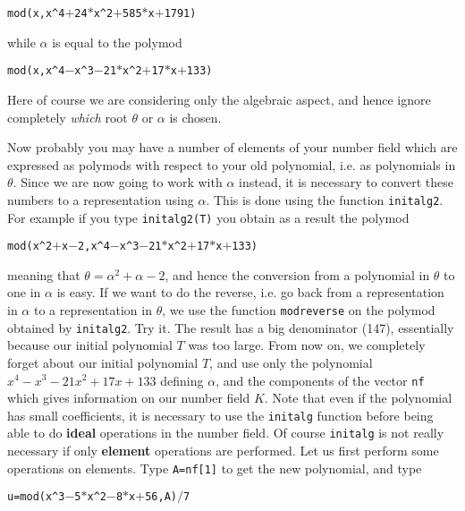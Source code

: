 \centerline{\tt mod(x,x\^{}4$+$24$*$x\^{}2$+$585$*$x$+$1791)}

while $\alpha$ is equal to the polymod

\centerline{\tt mod(x,x\^{}4$-$x\^{}3$-$21$*$x\^{}2$+$17$*$x$+$133)}

Here of course we are considering only the algebraic aspect, and hence ignore
completely {\it which} root $\theta$ or $\alpha$ is chosen.

Now probably you may have a number of elements of your number field which
are expressed as polymods with respect to your old polynomial, i.e. as
polynomials in $\theta$. Since we are now going to work with $\alpha$ instead,
it is necessary to convert these numbers to a representation using $\alpha$.
This is done using the function {\tt initalg2}. For example if you type
{\tt initalg2(T)} you obtain as a result the polymod

\centerline{\tt mod(x\^{}2$+$x$-$2,x\^{}4$-$x\^{}3$-$21$*$x\^{}2$+$17$*$x$+$133)}

meaning that $\theta=\alpha^2+\alpha-2$, and hence the conversion from a 
polynomial in $\theta$ to one in $\alpha$ is easy. If we want to do the
reverse, i.e. go back from a representation in $\alpha$ to a representation
in $\theta$, we use the function {\tt modreverse} on the polymod obtained
by {\tt initalg2}. Try it. The result has a big denominator (147), essentially
because our initial polynomial $T$ was too large.
\smallskip
From now on, we completely forget about our initial polynomial $T$, and use
only the polynomial $x^4-x^3-21x^2+17x+133$ defining $\alpha$, and
the components of the
vector {\tt nf} which gives information on our number field $K$. Note that 
even if the polynomial has small coefficients,
it is necessary to use the {\tt initalg} function before being able to do
{\bf ideal} operations in the number field. Of course {\tt initalg} is not
really necessary if only {\bf element} operations are performed.
\smallskip
Let us first perform some operations on elements. Type {\tt A=nf[1]} to get
the new polynomial, and type 

\centerline{\tt u=mod(x\^{}3$-$5$*$x\^{}2$-$8$*$x$+$56,A)$/$7} 

